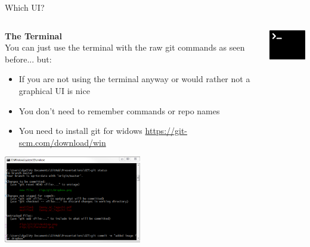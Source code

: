 \documentclass[10pt]{beamer}
\begin{document}
{\begin{frame}[fragile]{Which UI?}
\begin{columns}[T]
\begin{column}{.8\textwidth}
\textbf{The Terminal\\}
You can just use the terminal with the raw git commands as seen before... but:
\begin{itemize}
\item If you are not using the terminal anyway or would rather not a graphical UI is nice 
\item You don't need to remember commands or repo names 
\item You need to install git for widows \url{https://git-scm.com/download/win}
\end{itemize}
\includegraphics[width=6cm]{Figs/git/terminaluse}
\end{column}
\begin{column}{.2\textwidth}
\includegraphics[width=2cm]{Figs/git/terminal} \newline \newline \newline 
\end{column}
\end{columns}
\end{frame}



}
\end{document}
